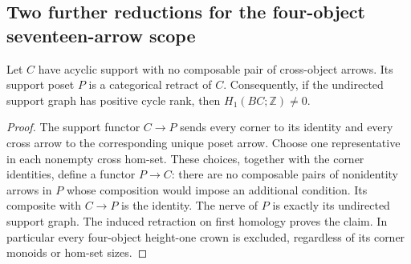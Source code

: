 \subsection{Two further reductions for the four-object seventeen-arrow scope}

\begin{lemma}
\label{CP2:A-height-one-support}
Let $C$ have acyclic support with no composable pair of cross-object
arrows. Its support poset $P$ is a categorical retract of $C$.
Consequently, if the undirected support graph has positive cycle rank,
then $H_1(BC;\mathbb Z)\ne0$.
\end{lemma}
\begin{proof}
The support functor $C\to P$ sends every corner to its identity and
every cross arrow to the corresponding unique poset arrow. Choose
one representative in each nonempty cross hom-set. These choices,
together with the corner identities, define a functor $P\to C$:
there are no composable pairs of nonidentity arrows in $P$ whose
composition would impose an additional condition. Its composite
with $C\to P$ is the identity. The nerve of $P$ is exactly its
undirected support graph. The induced retraction on first homology
proves the claim. In particular every four-object height-one crown
is excluded, regardless of its corner monoids or hom-set sizes.
\end{proof}

